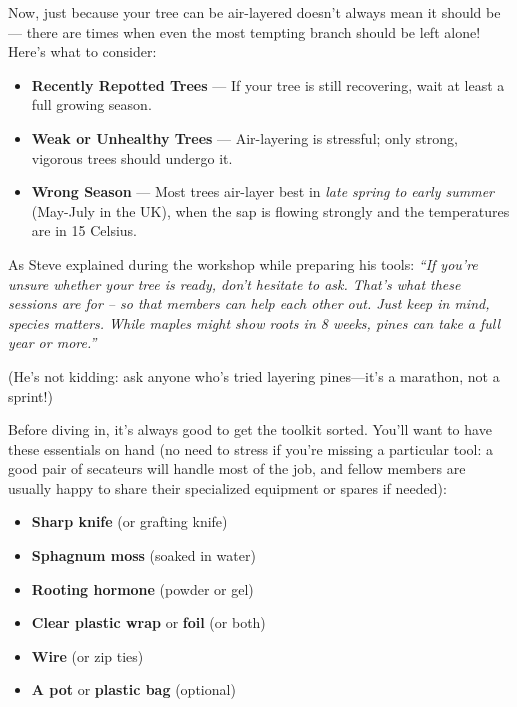 Now, just because your tree can be air\--layered doesn't always mean it should be --- there are times when even the most tempting branch should be left alone! 
Here's what to consider:  

\begin{itemize}
    \item \textbf{Recently Repotted Trees} --- If your tree is still recovering, wait at least a full growing season.

    \item \textbf{Weak or Unhealthy Trees} --- Air\--layering is stressful; only strong, vigorous trees should undergo it.

    \item \textbf{Wrong Season} --- Most trees air\--layer best in \textit{late spring to early summer} (May\--July in the UK), when the sap is flowing strongly and the temperatures are in 15 Celsius. 
\end{itemize}

As Steve explained during the workshop while preparing his tools: \textit{``If you're unsure whether your tree is ready, don't hesitate to ask. That's what these sessions are for -- so that members can help each other out. Just keep in mind, species matters. While maples might show roots in 8 weeks, pines can take a full year or more.''}

(He's not kidding: ask anyone who's tried layering pines---it's a marathon, not a sprint!)
\columnbreak

\medskip
{}
\noindent
Before diving in, it's always good to get the toolkit sorted. You'll want to have these essentials on hand (no need to stress if you're missing a particular tool: a good pair of secateurs will handle most of the job, and fellow members are usually happy to share their specialized equipment or spares if needed):

\begin{itemize}
    \item \textbf{Sharp knife} (or grafting knife)  

    \item \textbf{Sphagnum moss} (soaked in water)  

    \item \textbf{Rooting hormone} (powder or gel)  

    \item \textbf{Clear plastic wrap} or \textbf{foil} (or both)

    \item \textbf{Wire} (or zip ties)  

    \item \textbf{A pot} or \textbf{plastic bag} (optional) 
\end{itemize}

